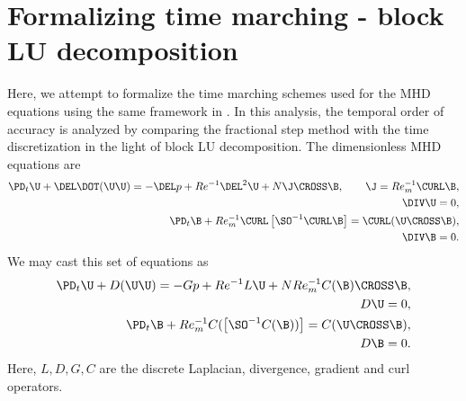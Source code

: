 \documentclass[11pt]{article}
\newcommand{\ReInv}{Re^{-1}}
\newcommand{\RemInv}{Re_m^{-1}}
\newcommand{\Al}{N Re_m^{-1}}
\newcommand{\Interaction}{N}
\begin{document}
\doublespacing
\MOONSTITLE

\section{Formalizing time marching - block LU decomposition}
Here, we attempt to formalize the time marching schemes used for the MHD equations using the same framework in \cite{Perot1993}. In this analysis, the temporal order of accuracy is analyzed by comparing the fractional step method with the time discretization in the light of block LU decomposition. The dimensionless MHD equations are
\begin{equation}\begin{aligned}
\PD_t \U + \DEL \DOT (\U \U) = - \DEL p + \ReInv \DEL^2 \U + \Interaction \J \CROSS \B, \qquad \J = \RemInv \CURL \B, \\
 \DIV \U = 0, \\
\PD_t \B + \RemInv \CURL \left[ \SO^{-1} \CURL \B \right] = \CURL (\U \CROSS \B), \\
 \DIV \B = 0.
\end{aligned} \end{equation}
We may cast this set of equations as
\begin{equation}\begin{aligned}
\PD_t \U + D (\U \U) = - G p + \ReInv L \U + \Al C(\B) \CROSS \B, \\
 D \U = 0, \\
\PD_t \B + \RemInv C (\left[ \SO^{-1} C(\B)) \right] = C (\U \CROSS \B), \\
 D \B = 0.
\end{aligned} \end{equation}
Here, $L,D,G,C$ are the discrete Laplacian, divergence, gradient and curl operators.

\newpage
\end{document}
